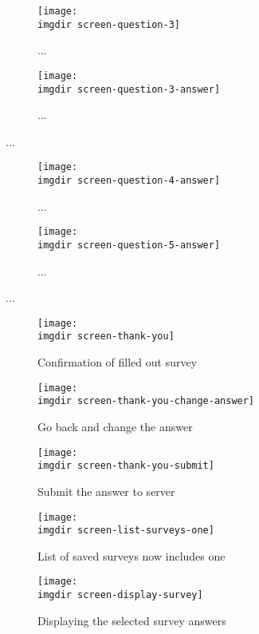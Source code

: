 \begin{figure}
 \centering
 \begin{subfigure}{.3\textwidth}
  \centering
  \texttt{[image: \\imgdir screen-question-3]}
  \caption{...}
  \label{fig:sfig1}
\end{subfigure}
\begin{subfigure}{.3\textwidth}
  \centering
  \texttt{[image: \\imgdir screen-question-3-answer]}
  \caption{...}
  \label{fig:sfig2}
\end{subfigure}
 \caption{...}
\end{figure}

\begin{figure}
 \centering
 \begin{subfigure}{.3\textwidth}
  \centering
  \texttt{[image: \\imgdir screen-question-4-answer]}
  \caption{...}
  \label{fig:sfig1}
\end{subfigure}
\begin{subfigure}{.3\textwidth}
  \centering
  \texttt{[image: \\imgdir screen-question-5-answer]}
  \caption{...}
  \label{fig:sfig2}
\end{subfigure}
 \caption{...}
\end{figure}

\begin{figure}
 \centering
 \begin{subfigure}{.3\textwidth}
  \centering
  \texttt{[image: \\imgdir screen-thank-you]}
  \caption{Confirmation of filled out survey}
  \label{fig:sfig1}
\end{subfigure}
\begin{subfigure}{.3\textwidth}
  \centering
  \texttt{[image: \\imgdir screen-thank-you-change-answer]}
  \caption{Go back and change the answer}
  \label{fig:sfig2}
\end{subfigure}
\begin{subfigure}{.3\textwidth}
  \centering
  \texttt{[image: \\imgdir screen-thank-you-submit]}
  \caption{Submit the answer to server}
  \label{fig:sfig2}
\end{subfigure}
\caption{...}
 \caption{}
\end{figure}

\begin{figure}
 \centering
 \begin{subfigure}{.3\textwidth}
  \centering
  \texttt{[image: \\imgdir screen-list-surveys-one]}
  \caption{List of saved surveys now includes one}
  \label{fig:sfig1}
\end{subfigure}
\begin{subfigure}{.3\textwidth}
  \centering
  \texttt{[image: \\imgdir screen-display-survey]}
  \caption{Displaying the selected survey answers}
  \label{fig:sfig2}
\end{subfigure}
\caption{...}
 \caption{}
\end{figure}
